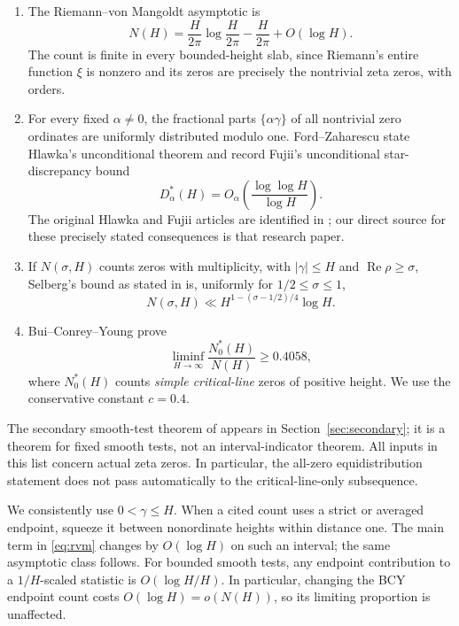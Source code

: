 \documentclass[11pt,a4paper]{article}
\theoremstyle{definition}
\theoremstyle{remark}
\DeclareMathOperator{\Rea}{Re}
\begin{document}
\begin{enumerate}
\item The Riemann--von Mangoldt asymptotic is
\begin{equation}\label{eq:rvm}
 N(H)=\frac{H}{2\pi}\log\frac{H}{2\pi}-\frac{H}{2\pi}+O(\log H).
\end{equation}
The count is finite in every bounded-height slab, since Riemann's entire
function $\xi$ is nonzero and its zeros are precisely the nontrivial zeta
zeros, with orders.
\item For every fixed $\alpha\ne0$, the fractional parts $\{\alpha\gamma\}$
of all nontrivial zero ordinates are uniformly distributed modulo one.
Ford--Zaharescu \cite[Introduction]{FZ} state Hlawka's unconditional theorem
and record Fujii's unconditional star-discrepancy bound
\begin{equation}\label{eq:fujii}
 D_\alpha^*(H)=O_\alpha\!\left(\frac{\log\log H}{\log H}\right).
\end{equation}
The original Hlawka and Fujii articles are identified in \cite{FZ}; our direct
source for these precisely stated consequences is that research paper.
\item If $N(\sigma,H)$ counts zeros with multiplicity, with $|\gamma|\le H$ and
$\Rea\rho\ge\sigma$, Selberg's bound as stated in
\cite[Lemma 2]{FZ} is, uniformly for $1/2\le\sigma\le1$,
\begin{equation}\label{eq:density}
 N(\sigma,H)\ll H^{1-(\sigma-1/2)/4}\log H.
\end{equation}
\item Bui--Conrey--Young \cite[Theorem 1.1]{BCY} prove
\begin{equation}\label{eq:bcy}
 \liminf_{H\to\infty}\frac{N_0^*(H)}{N(H)}\ge0.4058,
\end{equation}
where $N_0^*(H)$ counts \emph{simple critical-line} zeros of positive height.
We use the conservative constant $c=0.4$.
\end{enumerate}
The secondary smooth-test theorem of \cite{FZ} appears in
Section~\ref{sec:secondary}; it is a theorem for fixed smooth tests, not an
interval-indicator theorem. All inputs in this list concern actual zeta
zeros. In particular, the all-zero equidistribution statement does not pass
automatically to the critical-line-only subsequence.

We consistently use $0<\gamma\le H$. When a cited count uses a strict or
averaged endpoint, squeeze it between nonordinate heights within distance
one. The main term in \eqref{eq:rvm} changes by $O(\log H)$ on such an
interval; the same asymptotic class follows. For bounded smooth tests,
any endpoint contribution to a $1/H$-scaled statistic is $O(\log H/H)$.
In particular, changing the BCY endpoint count costs
$O(\log H)=o(N(H))$, so its limiting proportion is unaffected.
\end{document}
